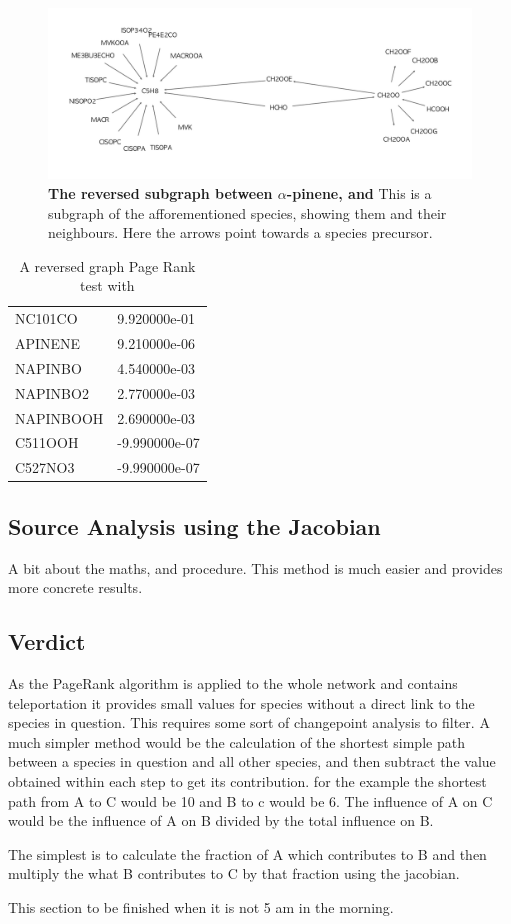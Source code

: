 \begin{figure}[H]
  \centering
  \includegraphics[width=\textwidth]{figures_c3/prtest0.png}
\caption{\textbf{The reversed subgraph between $\alpha$-pinene, and } This is a subgraph of the afforementioned species, showing them and their neighbours. Here the arrows point towards a species precursor. }
\label{fig:prtest1}
\end{figure}


\begin{table}[H]
\centering
\begin{tabular}{p{}p{}}
\toprule
NC101CO   &  9.920000e-01 \\
APINENE   &  9.210000e-06 \\
NAPINBO   &  4.540000e-03 \\
NAPINBO2  &  2.770000e-03 \\
NAPINBOOH &  2.690000e-03 \\
\midrule
C511OOH   & -9.990000e-07 \\
C527NO3   & -9.990000e-07 \\
\bottomrule
\end{tabular}

\caption{A reversed graph Page Rank test with }
\label{tab:ch2oo}
\end{table} 

\subsection{Source Analysis using the Jacobian}


A bit about the maths, and procedure. 
This method is much easier and provides more concrete results. 




\subsection{Verdict}
As the PageRank algorithm is applied to the whole network and contains teleportation it provides small values for species without a direct link to the species in question. This requires some sort of changepoint analysis to filter. A much simpler method would be the calculation of the shortest simple path between a species in question and all other species, and then subtract the value obtained within each step to get its contribution. for the example  the shortest path from A to C would be 10 and B to c would be 6. The influence of A on C would be the influence of A on B divided by the total influence on B.

The simplest is to calculate the fraction of A which contributes to B and then multiply the what B contributes to C by that fraction using the jacobian.

This section to be finished when it is not 5 am in the morning. 